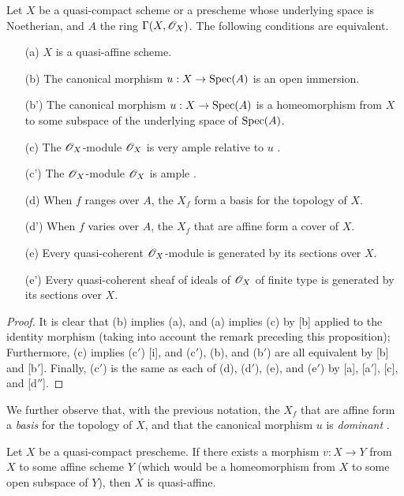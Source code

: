 \begin{proposition}[5.1.2]
\label{II.5.1.2}
Let $X$ be a quasi-compact scheme or a prescheme whose underlying space is Noetherian, and $A$ the ring $\Gamma(X,\mathscr{O}_X)$.
The following conditions are equivalent.
\begin{enumerate}
  \item[{\rm(a)}] $X$ is a quasi-affine scheme.
  \item[{\rm(b)}] The canonical morphism $u:X\to\Spec(A)$ is an open immersion.
  \item[{\rm(b')}] The canonical morphism $u:X\to\Spec(A)$ is a homeomorphism from $X$ to some subspace of the underlying space of $\operatorname{Spec}(A)$.
  \item[{\rm(c)}] The $\mathscr{O}_X$-module $\mathscr{O}_X$ is very ample relative to $u$ .
  \item[{\rm(c')}] The $\mathscr{O}_X$-module $\mathscr{O}_X$ is ample .
  \item[{\rm(d)}] When $f$ ranges over $A$, the $X_f$ form a basis for the topology of $X$.
  \item[{\rm(d')}] When $f$ varies over $A$, the $X_f$ that are affine form a cover of $X$.
  \item[{\rm(e)}] Every quasi-coherent $\mathscr{O}_X$-module is generated by its sections over $X$.
  \item[{\rm(e')}] Every quasi-coherent sheaf of ideals of $\mathscr{O}_X$ of finite type is generated by its sections over $X$.
\end{enumerate}
\end{proposition}

\begin{proof}
\label{proof-II.5.1.2}
It is clear that (b) implies (a), and (a) implies (c) by [b] applied to the identity morphism (taking into account the remark preceding this proposition);
Furthermore, (c) implies (c$'$) [i], and (c$'$), (b), and (b$'$) are all equivalent by [b] and [b$'$].
Finally, (c$'$) is the same as each of (d), (d$'$), (e), and (e$'$) by [a], [a$'$], [c], and [d$''$].
\end{proof}

We further observe that, with the previous notation, the $X_f$ that are affine form a \emph{basis} for the topology of $X$, and that the canonical morphism $u$ is \emph{dominant} .

\begin{corollary}[5.1.3]
\label{1.5.1.3}
Let $X$ be a quasi-compact prescheme.
If there exists a morphism $v:X\to Y$ from $X$ to some affine scheme $Y$ (which would be a homeomorphism from $X$ to some open subspace of $Y$), then $X$ is quasi-affine.
\end{corollary}

